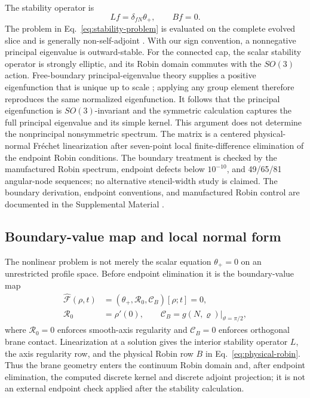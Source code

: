 \documentclass[11pt]{article}
\begin{document}
The stability operator is
\begin{equation}
Lf=\delta_{fN}\theta_+,
\qquad Bf=0.
\label{eq:stability-problem}
\end{equation}
The problem in Eq.~\eqref{eq:stability-problem} is evaluated on the complete
evolved slice and is generally
non-self-adjoint \cite{AnderssonMarsSimon2008}.  With our sign convention, a nonnegative principal
eigenvalue is outward-stable.  For the connected cap, the scalar stability
operator is strongly elliptic, and its Robin domain commutes with the $SO(3)$
action.  Free-boundary principal-eigenvalue theory supplies a positive
eigenfunction that is unique up to scale
\cite{AlaeeLesourdYau2020,deAlmeidaMendes2026}; applying any group element therefore reproduces the same
normalized eigenfunction.  It follows that the principal eigenfunction is
$SO(3)$-invariant and the symmetric calculation captures the full principal
eigenvalue and its simple kernel.  This argument does not determine the
nonprincipal nonsymmetric spectrum.  The matrix is a centered physical-normal
Fr\'echet linearization after seven-point local finite-difference elimination
of the endpoint Robin conditions.  The boundary treatment is checked by the
manufactured Robin spectrum, endpoint defects below $10^{-10}$, and 49/65/81
angular-node sequences; no alternative stencil-width study is claimed.
The boundary derivation, endpoint conventions, and manufactured Robin control
are documented in the Supplemental Material \cite{SupplementalMaterial}.

\subsection{Boundary-value map and local normal form}

The nonlinear problem is not merely the scalar equation $\theta_+=0$ on an
unrestricted profile space.  Before endpoint elimination it is the
boundary-value map
\begin{align}
\widehat{\mathcal F}(\rho,t)
&=\left(\theta_+,\mathcal R_0,\mathcal C_B\right)[\rho;t]=0,
\nonumber\\
\mathcal R_0&=\rho'(0),\qquad
\mathcal C_B=g(N,\varrho)\big|_{\vartheta=\pi/2},
\label{eq:free-boundary-map}
\end{align}
where $\mathcal R_0=0$ enforces smooth-axis regularity and
$\mathcal C_B=0$ enforces orthogonal brane contact.  Linearization at a
solution gives the interior stability operator $L$, the axis regularity row,
and the physical Robin row $B$ in Eq.~\eqref{eq:physical-robin}.  Thus the
brane geometry enters the continuum Robin domain and, after endpoint
elimination, the computed discrete kernel and discrete adjoint projection; it
is not an external endpoint check applied after the stability calculation.
\end{document}
